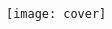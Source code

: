 \begin{titlepage}
	\begin{addmargin}[-1cm]{-3cm}
    \begin{center}
{
        \large

        \hfill

        \vfill

        \begingroup
            \color{Maroon}\spacedallcaps{\myTitle} \ \bigskip
        \endgroup

        \spacedlowsmallcaps{\myName}

        \vfill

\vfill
}
	\texttt{[image: cover]}


        \textsw{\myTime}
    \end{center}
  \end{addmargin}
\end{titlepage}
